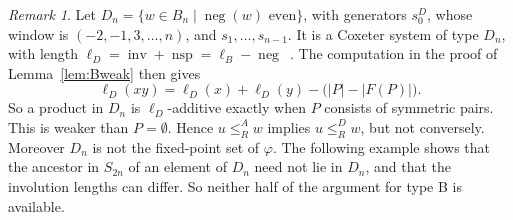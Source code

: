 \documentclass[11pt]{amsart}
\theoremstyle{definition}
\theoremstyle{remark}
\newtheorem{remark}[theorem]{Remark}
\numberwithin{equation}{section}
\newcommand{\leR}{\le_R}
\newcommand{\abs}[1]{\lvert #1\rvert}
\DeclareMathOperator{\invB}{inv}
\DeclareMathOperator{\negB}{neg}
\DeclareMathOperator{\nspB}{nsp}
\begin{document}
\begin{remark}\label{rem:D}
Let \(D_n=\{w\in B_n\mid\negB(w)\text{ even}\}\), with generators \(s_0^D\), whose window is \((-2,-1,3,\dots,n)\), and \(s_1,\dots,s_{n-1}\). It is a Coxeter system of type \(D_n\), with length \(\ell_D=\invB+\nspB=\ell_B-\negB\)~\cite[Ch.~8]{BB}. The computation in the proof of Lemma~\ref{lem:Bweak} then gives
\[
\ell_D(xy)=\ell_D(x)+\ell_D(y)-\bigl(\abs{P}-\abs{F(P)}\bigr).
\]
So a product in \(D_n\) is \(\ell_D\)-additive exactly when \(P\) consists of symmetric pairs. This is weaker than \(P=\emptyset\). Hence \(u\leR^A w\) implies \(u\leR^D w\), but not conversely. Moreover \(D_n\) is not the fixed-point set of \(\varphi\). The following example shows that the ancestor in \(S_{2n}\) of an element of \(D_n\) need not lie in \(D_n\), and that the involution lengths can differ. So neither half of the argument for type B is available.


\end{remark}
\end{document}
